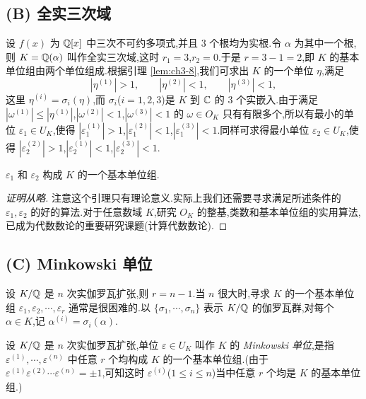 \subsection*{(B) 全实三次域}

设 $f(x)$ 为 $\mathbb{Q}[x]$ 中三次不可约多项式,并且 $3$ 个根均为实根.令 $\alpha$ 为其中一个根,则 $K=\mathbb{Q}(\alpha)$ 叫作全实三次域,这时 $r_1=3$,$r_2=0$.于是 $r=3-1=2$,即 $K$ 的基本单位组由两个单位组成.根据引理 \ref{lem:ch3-8},我们可求出 $K$ 的一个单位 $\eta$,满足
\[
  |\eta^{(1)}|>1,\qquad |\eta^{(2)}|<1,\qquad |\eta^{(3)}|<1,
\]
这里 $\eta^{(i)}=\sigma_i(\eta)$,而 $\sigma_i$($i=1,2,3$)是 $K$ 到 $\mathbb{C}$ 的 $3$ 个实嵌入.由于满足 $|\omega^{(1)}|\leqslant|\eta^{(1)}|$,$|\omega^{(2)}|<1$,$|\omega^{(3)}|<1$ 的 $\omega\in O_K$ 只有有限多个,所以有最小的单位 $\varepsilon_1\in U_K$,使得 $|\varepsilon_1^{(1)}|>1$,$|\varepsilon_1^{(2)}|<1$,$|\varepsilon_1^{(3)}|<1$.同样可求得最小单位 $\varepsilon_2\in U_K$,使得 $|\varepsilon_2^{(2)}|>1$,$|\varepsilon_2^{(1)}|<1$,$|\varepsilon_2^{(3)}|<1$.

\begin{lemma}\label{lem:ch3-13}
$\varepsilon_1$ 和 $\varepsilon_2$ 构成 $K$ 的一个基本单位组.
\end{lemma}

\begin{proof}[证明从略]
注意这个引理只有理论意义.实际上我们还需要寻求满足所述条件的 $\varepsilon_1,\varepsilon_2$ 的好的算法.对于任意数域 $K$,研究 $O_K$ 的整基,类数和基本单位组的实用算法,已成为代数数论的重要研究课题(计算代数数论).
\end{proof}

\subsection*{(C) Minkowski 单位}

设 $K/\mathbb{Q}$ 是 $n$ 次实伽罗瓦扩张,则 $r=n-1$.当 $n$ 很大时,寻求 $K$ 的一个基本单位组 $\varepsilon_1,\varepsilon_2,\cdots,\varepsilon_r$ 通常是很困难的.以 $\{\sigma_1,\cdots,\sigma_n\}$ 表示 $K/\mathbb{Q}$ 的伽罗瓦群,对每个 $\alpha\in K$,记 $\alpha^{(i)}=\sigma_i(\alpha)$.

\begin{definition}\label{def:ch3-6}
设 $K/\mathbb{Q}$ 是 $n$ 次实伽罗瓦扩张,单位 $\varepsilon\in U_K$ 叫作 $K$ 的 \emph{Minkowski 单位},是指 $\varepsilon^{(1)},\cdots,\varepsilon^{(n)}$ 中任意 $r$ 个均构成 $K$ 的一个基本单位组.(由于 $\varepsilon^{(1)}\varepsilon^{(2)}\cdots\varepsilon^{(n)}=\pm1$,可知这时 $\varepsilon^{(i)}$($1\leqslant i\leqslant n$)当中任意 $r$ 个均是 $K$ 的基本单位组.)
\end{definition}

